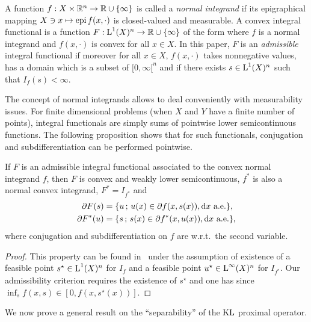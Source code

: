 \begin{definition}
\label{def_integralfunctional}
A function $f : X \times \mathbb{R}^n \to \mathbb{R} \cup \{\infty\}$ is called a \emph{normal integrand} if its epigraphical mapping $X \ni x \mapsto \operatorname{epi} f(x,\cdot)$ is closed-valued and measurable. A convex integral functional is a function $F:\text{\upshape L}^1(X)^n\to \mathbb{R}\cup \{\infty\}$ of the form
where $f$ is a normal integrand and $f(x,\cdot)$ is convex for all $x\in X$. 
%
In this paper, $F$ is an \emph{admissible} integral functional if moreover for all $x\in X$, $f(x,\cdot)$ takes nonnegative values, has a domain which is a subset of $ [0,\infty[^n$ and if there exists $s\in \text{\upshape L}^1(X)^n$ such that $I_f(s)<\infty$.
\end{definition}
The concept of normal integrands allows to deal conveniently with measurability issues. For finite dimensional problems (when $X$ and $Y$ have a finite number of points), integral functionals are simply sums of pointwise lower semicontinuous functions. The following proposition shows that for such functionals, conjugation and subdifferentiation can be performed pointwise.
%
\begin{proposition}\label{prop_normalconjug}
If $F$ is an admissible integral functional associated to the convex normal integrand $f$, then $F$ is convex and weakly lower semicontinuous, $f^*$ is also a normal convex integrand, $F^*=I_{f^*}$ and
\begin{align*}
\partial F(s) &= \{ u \, ; \, u(x) \in \partial f(x,s(x)), \mathrm{d} x \text{ a.e.}\},  \\
\partial F^*(u) &= \{ s \, ; \, s(x) \in \partial f^*(x,u(x)), \mathrm{d} x \text{ a.e.}\}, 
\end{align*}
where conjugation and subdifferentiation on $f$ are w.r.t.\ the second variable.
\end{proposition}
\begin{proof}
This property can be found in~\cite{rockafellar1976integral} under the assumption of existence of a feasible point $s^\star\in \text{\upshape L}^1(X)^n$ for $I_f$ and a feasible point $u^\star\in\text{\upshape L}^\infty(X)^n$ for $I_{f^*}$. Our admissibility criterion requires the existence of $s^\star$ and one has 
since $\inf_s f(x,s) \in [0, f(x,s^\star(x))]$.
\end{proof}
%
We now prove a general result on the ``separability'' of the $\operatorname{KL}$ proximal operator.
